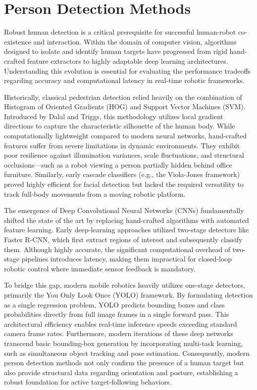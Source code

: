 \section{Person Detection Methods} %
Robust human detection is a critical prerequisite for successful human-robot co-existence and interaction. Within the domain of computer vision, algorithms designed to isolate and identify human targets have progressed from rigid hand-crafted feature extractors to highly adaptable deep learning architectures. Understanding this evolution is essential for evaluating the performance tradeoffs regarding accuracy and computational latency in real-time robotic frameworks.

Historically, classical pedestrian detection relied heavily on the combination of Histogram of Oriented Gradients (HOG) and Support Vector Machines (SVM). Introduced by Dalal and Triggs, this methodology utilizes local gradient directions to capture the characteristic silhouette of the human body. While computationally lightweight compared to modern neural networks, hand-crafted features suffer from severe limitations in dynamic environments. They exhibit poor resilience against illumination variances, scale fluctuations, and structural occlusions—such as a robot viewing a person partially hidden behind office furniture. Similarly, early cascade classifiers (e.g., the Viola-Jones framework) proved highly efficient for facial detection but lacked the required versatility to track full-body movements from a moving robotic platform.

The emergence of Deep Convolutional Neural Networks (CNNs) fundamentally shifted the state of the art by replacing hand-crafted algorithms with automated feature learning. Early deep-learning approaches utilized two-stage detectors like Faster R-CNN, which first extract regions of interest and subsequently classify them. Although highly accurate, the significant computational overhead of two-stage pipelines introduces latency, making them impractical for closed-loop robotic control where immediate sensor feedback is mandatory. 

To bridge this gap, modern mobile robotics heavily utilizes one-stage detectors, primarily the You Only Look Once (YOLO) framework. By formulating detection as a single regression problem, YOLO predicts bounding boxes and class probabilities directly from full image frames in a single forward pass. This architectural efficiency enables real-time inference speeds exceeding standard camera frame rates. Furthermore, modern iterations of these deep networks transcend basic bounding-box generation by incorporating multi-task learning, such as simultaneous object tracking and pose estimation. Consequently, modern person detection methods not only confirm the presence of a human target but also provide structural data regarding orientation and posture, establishing a robust foundation for active target-following behaviors.


